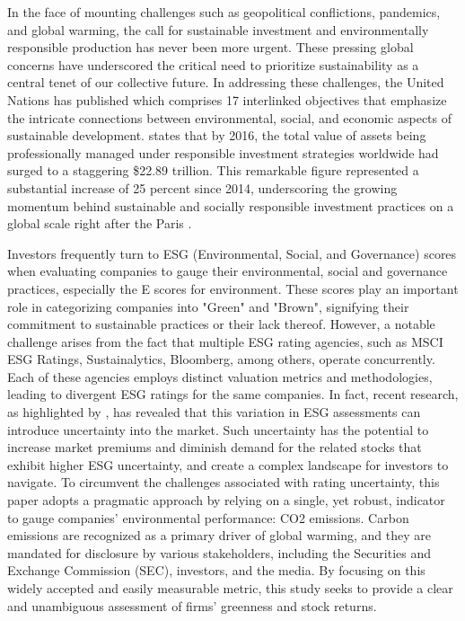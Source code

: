 \documentclass[12pt]{article}
\begin{document}
In the face of mounting challenges such as geopolitical conflictions, pandemics, and global warming, the call for sustainable investment and environmentally responsible production has never been more urgent. These pressing global concerns have underscored the critical need to prioritize sustainability as a central tenet of our collective future. In addressing these challenges, the United Nations has published \cite{fund2015sustainable} which comprises 17 interlinked objectives that emphasize the intricate connections between environmental, social, and economic aspects of sustainable development. \cite{alliance2017global} states that by 2016, the total value of assets being professionally managed under responsible investment strategies worldwide had surged to a staggering \$22.89 trillion. This remarkable figure represented a substantial increase of 25 percent since 2014, underscoring the growing momentum behind sustainable and socially responsible investment practices on a global scale right after the Paris \cite{agreement2015paris}.

Investors frequently turn to ESG (Environmental, Social, and Governance) scores when evaluating companies to gauge their environmental, social and governance practices, especially the E scores for environment. These scores play an important role in categorizing companies into "Green" and "Brown", signifying their commitment to sustainable practices or their lack thereof. However, a notable challenge arises from the fact that multiple ESG rating agencies, such as MSCI ESG Ratings, Sustainalytics, Bloomberg, among others, operate concurrently. Each of these agencies employs distinct valuation metrics and methodologies, leading to divergent ESG ratings for the same companies. In fact, recent research, as highlighted by \cite{avramov2022sustainable}, has revealed that this variation in ESG assessments can introduce uncertainty into the market. Such uncertainty has the potential to increase market premiums and diminish demand for the related stocks that exhibit higher ESG uncertainty, and create a complex landscape for investors to navigate. To circumvent the challenges associated with rating uncertainty, this paper adopts a pragmatic approach by relying on a single, yet robust, indicator to gauge companies' environmental performance: CO2 emissions. Carbon emissions are recognized as a primary driver of global warming, and they are mandated for disclosure by various stakeholders, including the Securities and Exchange Commission (SEC), investors, and the media. By focusing on this widely accepted and easily measurable metric, this study seeks to provide a clear and unambiguous assessment of firms' greenness and stock returns. 
\end{document}
